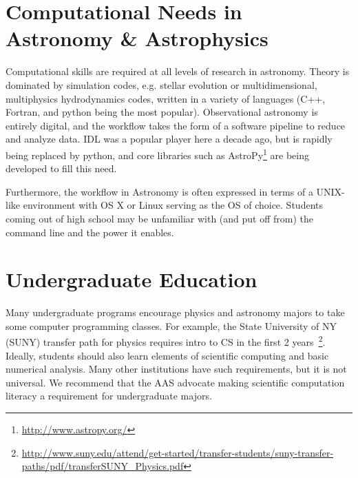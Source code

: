 \documentclass[11pt]{article}
\begin{document}
\section{Computational Needs in Astronomy \& Astrophysics}

Computational skills are required at all levels of research in
astronomy.  Theory is dominated by simulation codes, e.g. stellar
evolution or multidimensional, multiphysics hydrodynamics codes,
written in a variety of languages (C++, Fortran, and python being the
most popular).  Observational astronomy is entirely digital, and the
workflow takes the form of a software pipeline to reduce and analyze
data.  IDL was a popular player here a decade ago, but is rapidly
being replaced by python, and core libraries such as
AstroPy\footnote{\url{http://www.astropy.org/}} are being developed to
fill this need.

Furthermore, the workflow in Astronomy is often expressed in terms of
a UNIX-like environment with OS X or Linux serving as the OS of
choice.  Students coming out of high school may be unfamiliar with
(and put off from) the command line and the power it enables.

\section{Undergraduate Education}

Many undergraduate programs encourage physics and astronomy majors to
take some computer programming classes.  For example, the State
University of NY (SUNY) transfer path for physics requires intro to CS
in the first 2
years~\footnote{\url{http://www.suny.edu/attend/get-started/transfer-students/suny-transfer-paths/pdf/transferSUNY_Physics.pdf}}.
Ideally, students should also learn elements of scientific computing and
basic numerical analysis.  Many other institutions have such
requirements, but it is not universal.  We recommend that the AAS
advocate making scientific computation literacy a requirement for
undergraduate majors.
\end{document}

